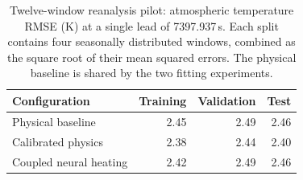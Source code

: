 \begin{table}[t]
\centering\small
\caption{Twelve-window reanalysis pilot: atmospheric temperature RMSE (K) at a single lead of 7397.937\,s. Each split contains four seasonally distributed windows, combined as the square root of their mean squared errors. The physical baseline is shared by the two fitting experiments.}
\label{tab:skill}
\begin{tabular}{lrrr}
\toprule
Configuration & Training & Validation & Test \\
\midrule
Physical baseline & 2.45 & 2.49 & 2.46 \\
Calibrated physics & 2.38 & 2.44 & 2.40 \\
Coupled neural heating & 2.42 & 2.49 & 2.46 \\
\bottomrule
\end{tabular}
\end{table}
